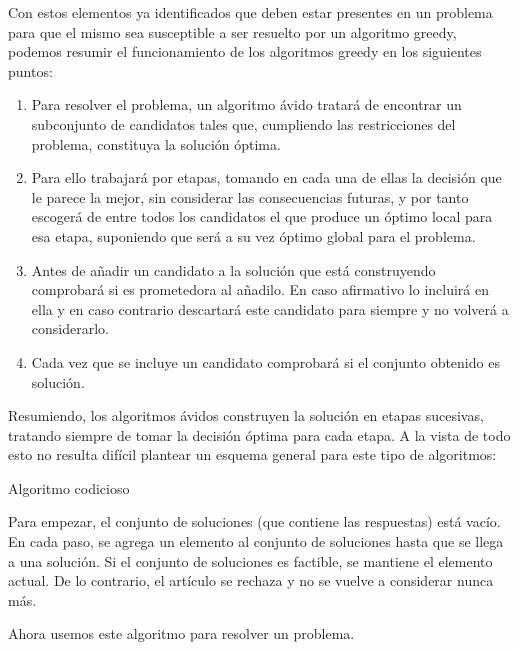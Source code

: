 Con estos elementos ya identificados que deben estar presentes en un problema para que el mismo sea susceptible a ser resuelto por un algoritmo greedy, podemos resumir el funcionamiento de los algoritmos
greedy en los siguientes puntos:

\begin{enumerate}
	\item Para resolver el problema, un algoritmo ávido tratará de encontrar un
	subconjunto de candidatos tales que, cumpliendo las restricciones del problema,
	constituya la solución óptima.
	\item Para ello trabajará por etapas, tomando en cada una de ellas la decisión que le
	parece la mejor, sin considerar las consecuencias futuras, y por tanto escogerá de entre todos los candidatos el que produce un óptimo local para esa etapa,
suponiendo que será a su vez óptimo global para el problema.
	\item Antes de añadir un candidato a la solución que está construyendo comprobará si es prometedora al añadilo. En caso afirmativo lo incluirá en ella y en caso
contrario descartará este candidato para siempre y no volverá a considerarlo.
	\item Cada vez que se incluye un candidato comprobará si el conjunto obtenido es
solución.
\end{enumerate}

Resumiendo, los algoritmos ávidos construyen la solución en etapas sucesivas, tratando siempre de tomar la decisión óptima para cada etapa. A la vista de todo esto no resulta difícil plantear un esquema general para este tipo de algoritmos:

Algoritmo codicioso

Para empezar, el conjunto de soluciones (que contiene las respuestas) está vacío.
En cada paso, se agrega un elemento al conjunto de soluciones hasta que se llega a una solución.
Si el conjunto de soluciones es factible, se mantiene el elemento actual.
De lo contrario, el artículo se rechaza y no se vuelve a considerar nunca más.

Ahora usemos este algoritmo para resolver un problema.